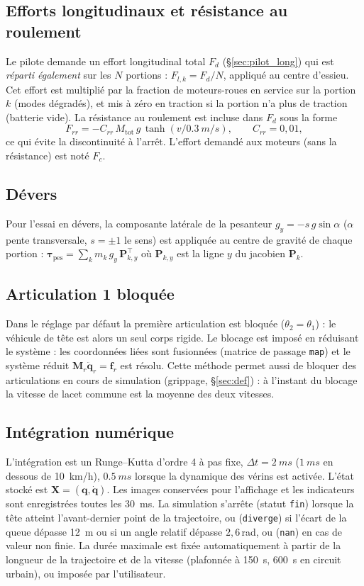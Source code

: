 \documentclass[11pt,a4paper]{article}
\newcommand{\vect}[1]{\bm{#1}}
\newcommand{\mat}[1]{\bm{#1}}
\newcommand{\T}{^{\!\top}}
\newcommand{\dt}[1]{\dot{#1}}
\newcommand{\ddt}[1]{\ddot{#1}}
\newcommand{\q}{\vect{q}}
\newcommand{\Mm}{\mat{M}}
\newcommand{\code}[1]{\texttt{#1}}
\begin{document}
\subsection{Efforts longitudinaux et résistance au roulement}\label{sec:long}
Le pilote demande un effort longitudinal total $F_d$ (§\ref{sec:pilot_long}) qui est \emph{réparti également} sur les $N$ portions : $F_{l,k}=F_d/N$, appliqué au centre d'essieu. Cet effort est multiplié par la fraction de moteurs-roues en service sur la portion $k$ (modes dégradés), et mis à zéro en traction si la portion n'a plus de traction (batterie vide). La résistance au roulement est incluse dans $F_d$ sous la forme
\begin{equation}
 F_{rr}=-C_{rr}\,M_{\text{tot}}\,g\,\tanh(v/\SI{0,3}{m/s}),\qquad C_{rr}=0{,}01,
\end{equation}
ce qui évite la discontinuité à l'arrêt. L'effort demandé aux moteurs (sans la résistance) est noté $F_c$.

\subsection{Dévers}
Pour l'essai en dévers, la composante latérale de la pesanteur $g_y=-s\,g\sin\alpha$ ($\alpha$ pente transversale, $s=\pm1$ le sens) est appliquée au centre de gravité de chaque portion : $\vect\tau_{\text{pes}}=\sum_k m_k\,g_y\,\mat P_{k,y}\T$ où $\mat P_{k,y}$ est la ligne $y$ du jacobien $\mat P_k$.

\subsection{Articulation 1 bloquée}
Dans le réglage par défaut la première articulation est bloquée ($\theta_2=\theta_1$) : le véhicule de tête est alors un seul corps rigide. Le blocage est imposé en réduisant le système : les coordonnées liées sont fusionnées (matrice de passage \code{map}) et le système réduit $\Mm_r\ddt\q_r=\vect f_r$ est résolu. Cette méthode permet aussi de bloquer des articulations en cours de simulation (grippage, §\ref{sec:def}) : à l'instant du blocage la vitesse de lacet commune est la moyenne des deux vitesses.

\subsection{Intégration numérique}\label{sec:integ}
L'intégration est un Runge--Kutta d'ordre 4 à pas fixe, $\Delta t=\SI{2}{ms}$ ($\SI{1}{ms}$ en dessous de \SI{10}{km/h}), $\SI{0,5}{ms}$ lorsque la dynamique des vérins est activée. L'état stocké est $\vect X=(\q,\dt\q)$. Les images conservées pour l'affichage et les indicateurs sont enregistrées toutes les \SI{30}{ms}. La simulation s'arrête (statut \code{fin}) lorsque la tête atteint l'avant-dernier point de la trajectoire, ou (\code{diverge}) si l'écart de la queue dépasse \SI{12}{m} ou si un angle relatif dépasse $2{,}6$\,rad, ou (\code{nan}) en cas de valeur non finie. La durée maximale est fixée automatiquement à partir de la longueur de la trajectoire et de la vitesse (plafonnée à \SI{150}{s}, \SI{600}{s} en circuit urbain), ou imposée par l'utilisateur.
\end{document}
